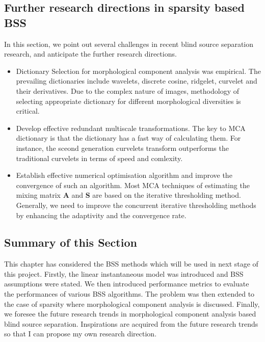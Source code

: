 \subsection{Further research directions in sparsity based BSS}
In this section, we point out several challenges in recent blind source separation research, and anticipate the further research directions.\\
\begin{itemize}
    \item Dictionary Selection for morphological component analysis was empirical. The prevailing dictionaries include wavelets, discrete cosine, ridgelet, curvelet and their derivatives. Due to the complex nature of images, methodology of selecting appropriate dictionary for different  morphological diversities is critical.
    \item Develop effective redundant multiscale transformations. The key to MCA dictionary is that the dictionary has a fast way of calculating them. For instance, the sceond generation curvelets transform outperforms the traditional curvelets in terms of speed and comlexity.
    \item Establish effective numerical optimisation algorithm and improve the convergence of such an algorithm. Most MCA techniques of estimating the mixing matrix $\mathbf{A}$ and $\mathbf{S}$ are based on the iterative thresholding method. Generally, we need to improve the concurrent iterative thresholding methods by enhancing the adaptivity and the convergence rate.
\end{itemize}

\subsection{Summary of this Section}
This chapter has considered the BSS methods which will be used in next stage of this project. Firstly, the linear instantaneous model was introduced and BSS assumptions were stated. We then introduced performance metrics to evaluate the performances of various BSS algorithms. The problem was then extended to the case of sparsity where morphological component analysis is discussed. Finally, we foresee the future research trends in morphological component analysis based blind source separation. Inspirations are acquired from the future research trends so that I can propose my own research direction.

